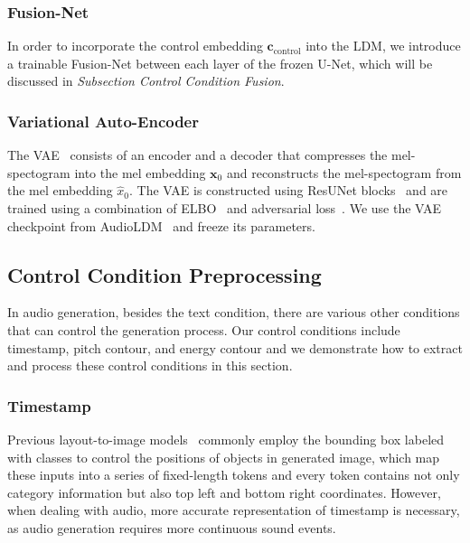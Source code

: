 \documentclass[letterpaper]{article}
\begin{document}
\subsubsection{Fusion-Net} In order to incorporate the control embedding $\mathbf{c}_{\text{control}}$ into the LDM, we introduce a trainable Fusion-Net between each layer of the frozen U-Net, which will be discussed in \textit{Subsection Control Condition Fusion}.

\subsubsection{Variational Auto-Encoder} The VAE~\cite{kingma2013vae} consists of an encoder and a decoder that compresses the mel-spectogram into the mel embedding $\mathbf{x}_{0}$ and reconstructs the mel-spectogram from the mel embedding $\hat{x}_0$. The VAE is constructed using ResUNet blocks~\cite{kong2021decouplingma} and are trained using a combination of ELBO~\cite{kingma2013vae} and adversarial loss~\cite{isola2017itiadversarial}. We use the VAE checkpoint from AudioLDM~\cite{liu2023audioldm} and freeze its parameters.

\subsection{Control Condition Preprocessing}
\label{control condition preprocessing}

In audio generation, besides the text condition, there are various other conditions that can control the generation process. Our control conditions include timestamp, pitch contour, and energy contour and we demonstrate how to extract and process these control conditions in this section.

\subsubsection{Timestamp} Previous layout-to-image models~\cite{li2023gligen,jahn2021highresolutioncs,li2021lama} commonly employ the bounding box labeled with classes to control the positions of objects in generated image, which map these inputs into a series of fixed-length tokens and every token contains not only category information but also top left and bottom right coordinates. However, when dealing with audio, more accurate representation of timestamp is necessary, as audio generation requires more continuous sound events.
\end{document}
